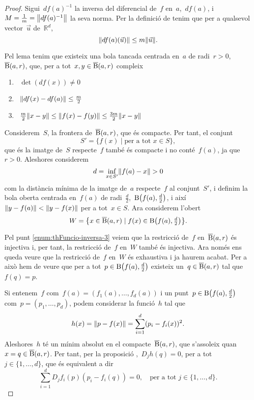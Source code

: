 \documentclass[../calcul-en-diverses-variables.tex]{subfiles}
\begin{document}
    \begin{proof}
        Sigui~\(df(a)^{-1}\) la inversa del diferencial de~\(f\) en~\(a\),~\(df(a)\), i~\(M=\frac{1}{m}=\norm{df(a)^{-1}}\) la seva norma.
        Per la definició de  tenim que per a qualsevol vector~\(\vec{u}\) de~\(\mathbb{R}^{d}\),
        \[
            \norm{df(a)(\vec{u})}\leq m\norm{\vec{u}}.
        \]

        Pel lema  tenim que existeix una bola tancada centrada en~\(a\) de radi~\(r>0\),~\(\overline{\operatorname{B}}(a,r)\), que, per a tot~\(x,y\in\overline{\operatorname{B}}(a,r)\) compleix
        \begin{enumerate}
            \item\label{enum:thFuncio-inversa-1}~\(\det(df(x))\neq0\)
            \item\label{enum:thFuncio-inversa-2}~\(\norm{df(x)-df(a)}\leq\frac{m}{2}\)
            \item\label{enum:thFuncio-inversa-3}~\(\frac{m}{2}\norm{x-y} \leq\norm{f(x)-f(y)}\leq\frac{3m}{2}\norm{x-y}\)
        \end{enumerate}

        Considerem~\(S\), la frontera de~\(\overline{\operatorname{B}}(a,r)\), que és compacte.
        Per tant, el conjunt
        \[
            S'=\{f(x)\mid\text{per a tot }x\in S\},
        \]
        que és la imatge de~\(S\) respecte~\(f\) també és compacte i no conté~\(f(a)\), ja que~\(r>0\).
        Aleshores considerem
        \[
            d=\inf_{x\in S'}\norm{f(a)-x}>0
        \]
        com la distància mínima de la imatge de~\(a\) respecte~\(f\) al conjunt~\(S'\), i definim la bola oberta centrada en~\(f(a)\) de radi~\(\frac{d}{2}\),~\(\B\left(f(a),\tfrac{d}{2}\right)\), i així~\(\norm{y-f(a)}<\norm{y-f(x)}\) per a tot~\(x\in S\).
        Ara considerem l'obert
        \[
            W=\left\{x\in\overline{\B}(a,r)\mid f(x)\in\B\left(f(a),\tfrac{d}{2}\right)\right\}.
        \]

        Pel punt \eqref{enum:thFuncio-inversa-3} veiem que la restricció de~\(f\) en~\(\overline{\operatorname{B}}(a,r)\) és injectiva i, per tant, la restricció de~\(f\) en~\(W\) també és injectiva.
        Ara només ens queda veure que la restricció de~\(f\) en~\(W\) és exhaustiva i ja haurem acabat.
        Per a això hem de veure que per a tot~\(p\in\B\left(f(a),\tfrac{d}{2}\right)\) existeix un~\(q\in\overline{\operatorname{B}}(a,r)\) tal que~\(f(q)=p\).

        Si entenem~\(f\) com~\(f(a)=(f_{1}(a),\dots,f_{d}(a))\) i un punt~\(p\in\B\left(f(a),\tfrac{d}{2}\right)\) com~\(p=(p_{1},\dots,p_{d})\), podem considerar la funció~\(h\) tal que
        \[
            h(x)=\norm{p-f(x)}=\sum_{i=1}^{d}(p_{i}-f_{i}(x))^{2}.
        \]
        Aleshores~\(h\) té un mínim absolut en el compacte~\(\overline{\operatorname{B}}(a,r)\), que s'assoleix quan~\(x=q\in\overline{\operatorname{B}}(a,r)\).
        Per tant, per la proposició ,~\(D_{j}h(q)=0\), per a tot~\(j\in\{1,\dots,d\}\), que és equivalent a dir
        \[
            \sum_{i=1}^{d}D_{j}f_{i}(p)(p_{i}-f_{i}(q))=0,\quad\text{per a tot }j\in\{1,\dots,d\}.
        \]


\end{proof}
\end{document}
